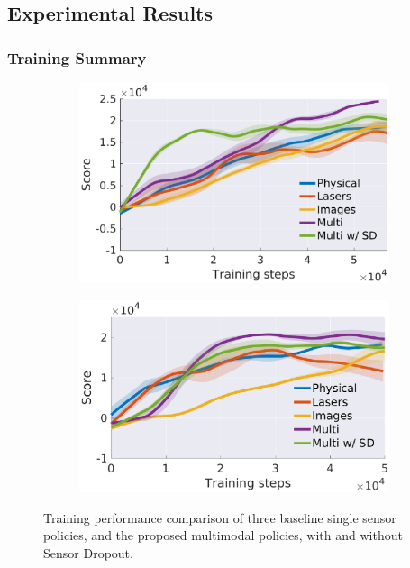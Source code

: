 \documentclass[../thesis.tex]{subfiles}
\begin{document}
\subsection{Experimental Results} %
\subsubsection{Training Summary}

\begin{figure}[t]
    \centering
    \begin{subfigure}[b]{0.48\linewidth}
        \includegraphics[width=\columnwidth]{./MultimodalDRL/fig/training_step_naf_without_aux}
        \label{fig:training_exp_naf}
    \end{subfigure}
    \begin{subfigure}[b]{0.48\linewidth}
        \includegraphics[width=\columnwidth]{./MultimodalDRL/fig/training_step_ddpg_without_aux}
        \label{fig:training_exp_ddpg}
    \end{subfigure}
    \caption{Training performance comparison of three baseline single sensor policies, and the proposed multimodal policies, with and without Sensor Dropout.}
    \label{fig:training_exp}
\end{figure}
\end{document}
